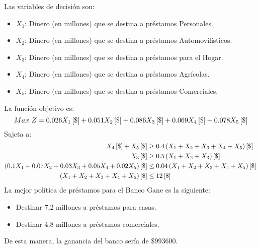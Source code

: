 \documentclass{tarea}
\begin{document}
\begin{homeworkProblem}
Las variables de decisión son:
\begin{itemize}
	\item  $X_1$: Dinero (en millones) que se destina a préstamos Personales.
	\item  $X_2$: Dinero (en millones) que se destina a préstamos Automovilísticos.
	\item  $X_3$: Dinero (en millones) que se destina a préstamos para el Hogar.
	\item  $X_4$: Dinero (en millones) que se destina a préstamos Agrícolas.
	\item  $X_5$: Dinero (en millones) que se destina a préstamos Comerciales.
\end{itemize}
La función objetivo es: 
\begin{equation}
	Max\ Z = 0.026X_1\left[ \$ \right] +0.051X_2\left[ \$ \right] + 0.086X_3\left[ \$ \right] + 0.069X_4\left[ \$ \right] + 0.078X_5\left[ \$ \right]
\end{equation}
Sujeta a:
\begin{align*}
	X_4\left[ \$ \right] + X_5\left[ \$ \right] &\ge 0.4\left( X_1 + X_2 + X_3 + X_4 +X_5 \right)\left[ \$ \right] \\
	X_3\left[ \$ \right] &\ge 0.5\left( X_1 + X_2 + X_3 \right)\left[ \$ \right]\\
	\left( 0.1X_1 + 0.07X_2 + 0.03X_3 + 0.05X_4 + 0.02X_5 \right)\left[ \$ \right] &\le 0.04\left( X_1 + X_2 + X_3+X_4 +X_5 \right)\left[ \$ \right] \\
	\left( X_1 + X_2 + X_3 +X_4 +X_5 \right)\left[ \$ \right] &\le 12\left[ \$ \right]
\end{align*}
La mejor política de préstamos para el Banco Gane es la siguiente:
\begin{itemize}
	\item Destinar 7,2 millones a préstamos para casas.
	\item Destinar 4,8 millones a préstamos comerciales.
\end{itemize}
De esta manera, la ganancia del banco sería de $\$993600$.
\end{homeworkProblem}
\end{document}

